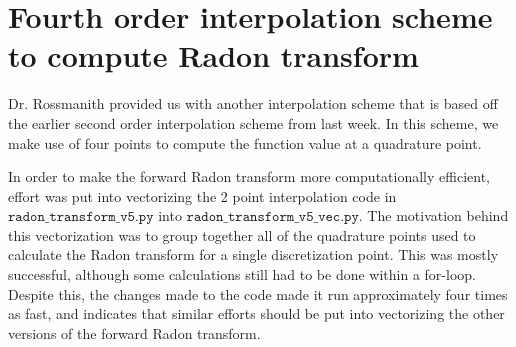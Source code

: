 
\section*{Fourth order interpolation scheme to compute Radon transform}
Dr. Rossmanith provided us with another interpolation scheme that is based off the earlier second order interpolation scheme from last week.
In this scheme, we make use of four points to compute the function value at a quadrature point.

In order to make the forward Radon transform more computationally efficient, effort was put into vectorizing the 2 point interpolation code in $\texttt{radon\_transform\_v5.py}$ into $\texttt{radon\_transform\_v5\_vec.py}$.
The motivation behind this vectorization was to group together all of the quadrature points used to calculate the Radon transform for a single discretization point.
This was mostly successful, although some calculations still had to be done within a for-loop.
Despite this, the changes made to the code made it run approximately four times as fast, and indicates that similar efforts should be put into vectorizing the other versions of the forward Radon transform.
